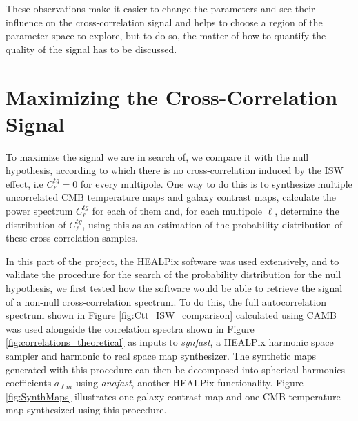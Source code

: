 \documentclass[openany,a4paper,12pt,oneside]{book}
\begin{document}
\begin{spacing}{1.5}
These observations make it easier to change the parameters and see their influence on the cross-correlation signal and helps to choose a region of the parameter space to explore, but to do so, the matter of how to quantify the quality of the signal has to be discussed.

\section{Maximizing the Cross-Correlation Signal}

To maximize the signal we are in search of, we compare it with the null hypothesis, according to which there is no cross-correlation induced by the ISW effect, i.e $C^{tg}_\ell=0$ for every multipole. One way to do this is to synthesize multiple uncorrelated CMB temperature maps and galaxy contrast maps, calculate the power spectrum $C^{tg}_\ell$ for each of them and, for each multipole $\ell$, determine the distribution of $C^{tg}_\ell$, using this as an estimation of the probability distribution of these cross-correlation samples.

In this part of the project, the HEALPix software was used extensively, and to validate the procedure for the search of the probability distribution for the null hypothesis, we first tested how the software would be able to retrieve the signal of a non-null cross-correlation spectrum. To do this, the full autocorrelation spectrum shown in Figure \ref{fig:Ctt_ISW_comparison} calculated using CAMB was used alongside the correlation spectra shown in Figure \ref{fig:correlations_theoretical} as inputs to {\it synfast}, a HEALPix harmonic space sampler and harmonic to real space map synthesizer. The synthetic maps generated with this procedure can then be decomposed into spherical harmonics coefficients $a_{\ell m}$ using {\it anafast}, another HEALPix functionality. Figure \ref{fig:SynthMaps} illustrates one galaxy contrast map and one CMB temperature map synthesized using this procedure.


\end{spacing}
\end{document}
